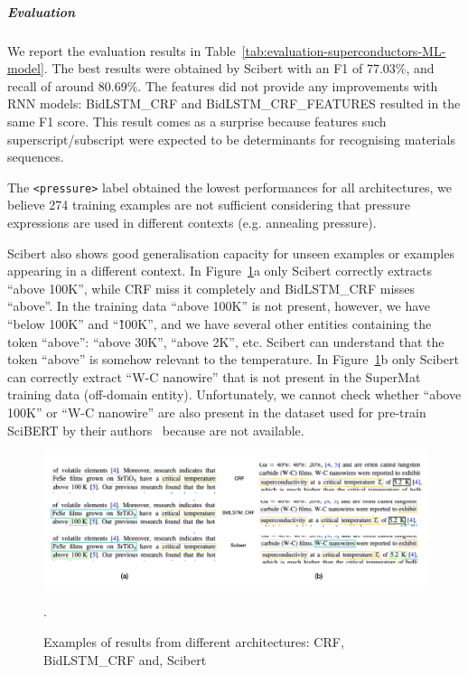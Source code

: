 \documentclass{article}
\begin{document}
\subparagraph{Evaluation}

We report the evaluation results in Table~\ref{tab:evaluation-superconductors-ML-model}. 
The best results were obtained by Scibert with an F1 of 77.03\%, and recall of around 80.69\%. 
The features did not provide any improvements with RNN models: BidLSTM\_CRF and BidLSTM\_CRF\_FEATURES resulted in the same F1 score.
This result comes as a surprise because features such superscript/subscript were expected to be determinants for recognising materials sequences. 

The \texttt{<pressure>} label obtained the lowest performances for all architectures, we believe 274 training examples are not sufficient considering that pressure expressions are used in different contexts (e.g. annealing pressure).

Scibert also shows good generalisation capacity for unseen examples or examples appearing in a different context. 
In Figure~\ref{fig:example-comparison-architectures}a only Scibert correctly extracts ``above 100K'', while CRF miss it completely and BidLSTM\_CRF misses ``above''. 
In the training data ``above 100K'' is not present, however, we have ``below 100K'' and ``\~100K'', and we have several other entities containing the token ``above'': ``above 30K'', ``above 2K'', etc. 
Scibert can understand that the token ``above'' is somehow relevant to the temperature. 
In Figure~\ref{fig:example-comparison-architectures}b only Scibert can correctly extract ``W-C nanowire'' that is not present in the SuperMat training data (off-domain entity). 
Unfortunately, we cannot check whether ``above 100K'' or ``W-C nanowire'' are also present in the dataset used for pre-train SciBERT by their authors~\cite{Beltagy2019SciBERT} because are not available. 

\begin{figure}[ht]
\centering
\includegraphics[width=\textwidth]{example-comparison-archs.png}
\caption{Examples of results from different architectures: CRF, BidLSTM\_CRF and, Scibert}.
\label{fig:example-comparison-architectures}
\end{figure}
\end{document}
